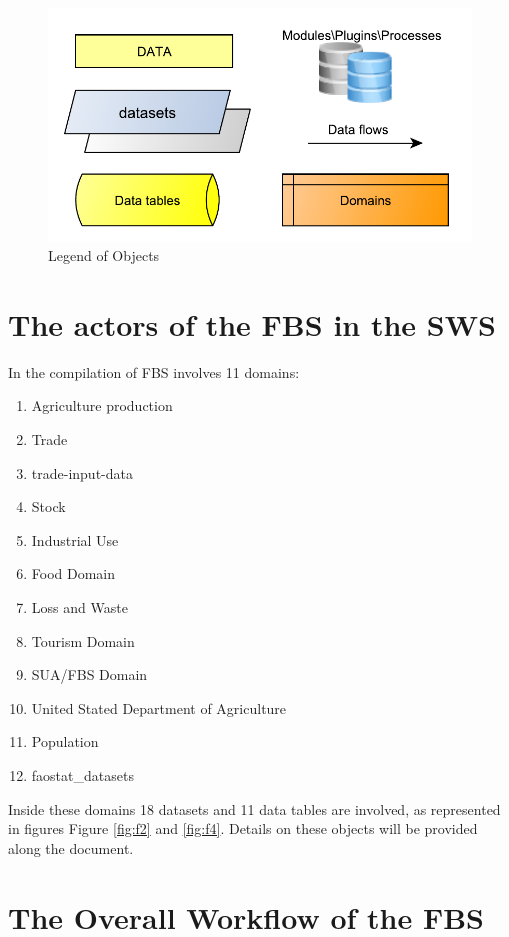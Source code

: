 \documentclass[]{article}
\providecommand{\tightlist}{%
  \setlength{\itemsep}{0pt}\setlength{\parskip}{0pt}}
\begin{document}
\begin{figure}[H]

{\centering \includegraphics[width=0.7\linewidth]{images/SwsFbs/01_actors} 

}

\caption{\label{fig:f1}Legend of Objects}\label{fig:f1}
\end{figure}

\section*{The actors of the FBS in the
SWS}\label{the-actors-of-the-fbs-in-the-sws}

In the compilation of FBS involves 11 domains:

\begin{enumerate}
\def\labelenumi{\arabic{enumi}.}
\tightlist
\item
  Agriculture production
\item
  Trade
\item
  trade-input-data
\item
  Stock
\item
  Industrial Use
\item
  Food Domain
\item
  Loss and Waste
\item
  Tourism Domain
\item
  SUA/FBS Domain
\item
  United Stated Department of Agriculture
\item
  Population
\item
  faostat\_datasets
\end{enumerate}

Inside these domains 18 datasets and 11 data tables are involved, as
represented in figures Figure \ref{fig:f2} and \ref{fig:f4}. Details on
these objects will be provided along the document.

\section*{The Overall Workflow of the
FBS}\label{the-overall-workflow-of-the-fbs}
\end{document}
